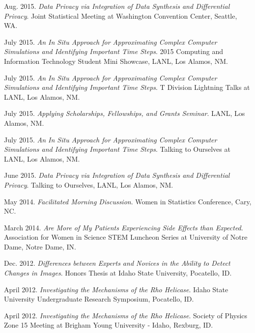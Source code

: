 \begin{etaremune}[topsep=0pt, itemsep=2.5pt, partopsep=0pt, parsep=0pt]
    \item Aug. 2015. \textit{Data Privacy via Integration of Data Synthesis and Differential Privacy}. Joint Statistical Meeting at Washington Convention Center, Seattle, WA.
    
    \item July 2015. \textit{An In Situ Approach for Approximating Complex Computer Simulations and Identifying Important Time Steps}. 2015 Computing and Information Technology Student Mini Showcase, LANL, Los Alamos, NM.
    
    \item July 2015. \textit{An In Situ Approach for Approximating Complex Computer Simulations and Identifying Important Time Steps}. T Division Lightning Talks at LANL, Los Alamos, NM.
    
    \item July 2015. \textit{Applying Scholarships, Fellowships, and Grants Seminar}. LANL, Los Alamos, NM.
    
    \item July 2015. \textit{An In Situ Approach for Approximating Complex Computer Simulations and Identifying Important Time Steps}. Talking to Ourselves at LANL, Los Alamos, NM.
    
    \item June 2015. \textit{Data Privacy via Integration of Data Synthesis and Differential Privacy}. Talking to Ourselves, LANL, Los Alamos, NM. 
    
    \item May 2014. \textit{Facilitated Morning Discussion}. Women in Statistics Conference, Cary, NC.
    
    \item March 2014. \textit{Are More of My Patients Experiencing Side Effects than Expected}. Association for Women in Science STEM Luncheon Series at University of Notre Dame, Notre Dame, IN.
    
    \item Dec. 2012. \textit{Differences between Experts and Novices in the Ability to Detect Changes in Images}. Honors Thesis at Idaho State University, Pocatello, ID.
    
    \item April 2012. \textit{Investigating the Mechanisms of the Rho Helicase}. Idaho State University Undergraduate Research Symposium, Pocatello, ID.
    
    \item April 2012. \textit{Investigating the Mechanisms of the Rho Helicase}. Society of Physics Zone 15 Meeting at Brigham Young University - Idaho, Rexburg, ID.
    

\end{etaremune}
